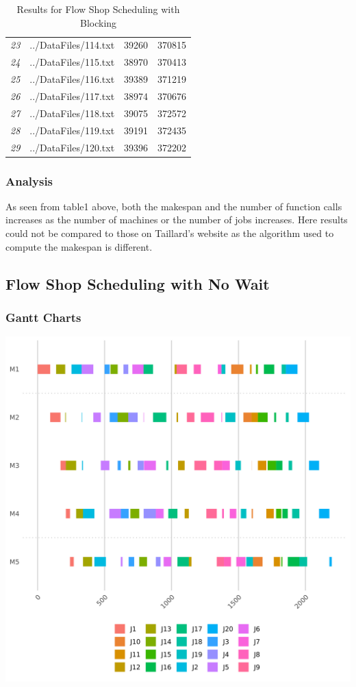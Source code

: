 \documentclass[12pt]{article}
\begin{document}
\begin{table}[ht]
{\begin{tabular}{rlrr}
								{\textit{23}} & ../DataFiles/114.txt & 39260 & 370815 \\ 
								{\textit{24}} & ../DataFiles/115.txt & 38970 & 370413 \\ 
								{\textit{25}} & ../DataFiles/116.txt & 39389 & 371219 \\ 
								{\textit{26}} & ../DataFiles/117.txt & 38974 & 370676 \\ 
								{\textit{27}} & ../DataFiles/118.txt & 39075 & 372572 \\ 
								{\textit{28}} & ../DataFiles/119.txt & 39191 & 372435 \\ 
								{\textit{29}} & ../DataFiles/120.txt & 39396 & 372202 \\ 
								\hline
							\end{tabular}
						}
					\caption{Results for Flow Shop Scheduling with Blocking}
				\end{table}
			
			\subsubsection{Analysis}
				As seen from table1 above, both the makespan and the number of function calls increases as the number of machines or the number of jobs increases. Here results could not be compared to those on Taillard's website as the algorithm used to compute the makespan is different.
					
			\subsection{Flow Shop Scheduling with No Wait}
				\subsubsection{Gantt Charts}
				\includegraphics[width=\linewidth]{5_20_GC_3.png}
				
\end{document}

